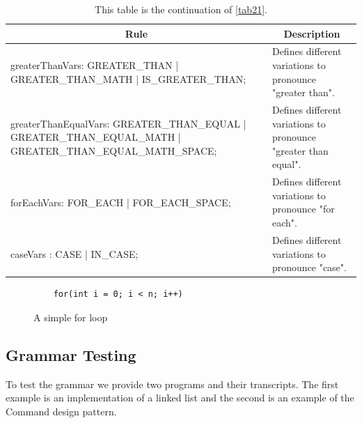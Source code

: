 \begin{table}[H]
	\centering
	\begin{tabular}{|p{8cm}|p{7cm}|}
		\hline
		\multicolumn{1}{|c|}{{\bf Rule}} & \multicolumn{1}{c|}{{\bf Description}} \\ \hline
		greaterThanVars: GREATER\_THAN | GREATER\_THAN\_MATH | IS\_GREATER\_THAN; & Defines different variations to pronounce "greater than". \\ \hline
		greaterThanEqualVars: GREATER\_THAN\_EQUAL | GREATER\_THAN\_EQUAL\_MATH | GREATER\_THAN\_EQUAL\_MATH\_SPACE; & Defines different variations to pronounce "greater than equal". \\ \hline
		forEachVars: FOR\_EACH | FOR\_EACH\_SPACE; & Defines different variations to pronounce "for each". \\ \hline
		caseVars : CASE | IN\_CASE; & Defines different variations to pronounce "case". \\ \hline
	\end{tabular}
	\caption{This table is the continuation of \autoref{tab21}.}
	\label{tab22}
\end{table}

\begin{figure}[H]
	\begin{lstlisting}
	for(int i = 0; i < n; i++)
	\end{lstlisting}
	\caption{A simple for loop}
	\label{fig20}
\end{figure}

\subsection{Grammar Testing} \label{subsection: Grammar Testing}
To test the grammar we provide two programs and their transcripts. The first example is an implementation of a linked list and the second is an example of the Command design pattern. 
